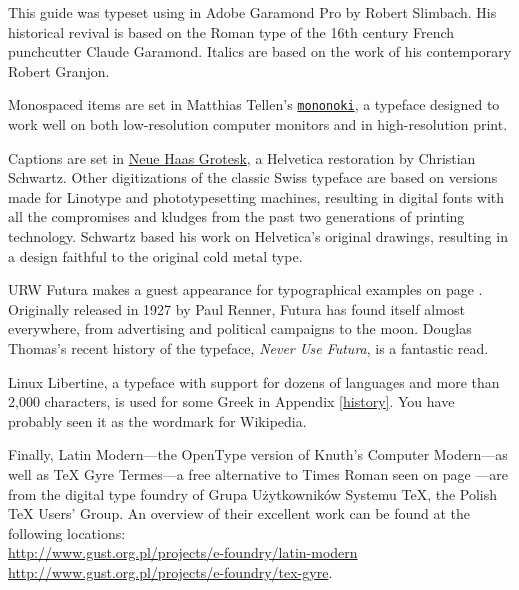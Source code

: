 This guide was typeset using \LuaLaTeX{} in Adobe Garamond Pro by
Robert Slimbach.
His historical revival is based on the Roman type of
the 16{th} century French
punchcutter Claude Garamond.
Italics are based on the work of his contemporary Robert Granjon.

Monospaced items are set in Matthias Tellen's
\href{https://madmalik.github.io/mononoki/}{\texttt{mononoki}},
a typeface designed to work well on both low-resolution computer monitors
and in high-resolution print.

Captions are set in
\href{http://www.fontbureau.com/NHG/}{\textsf{\small Neue Haas Grotesk}},
a Helvetica restoration by Christian Schwartz.
Other digitizations of the classic Swiss typeface are based on versions made for
Linotype and phototypesetting machines,
resulting in digital fonts with all the compromises and kludges from the past two
generations of printing technology.
Schwartz based his work on Helvetica's original drawings,
resulting in a design faithful to the original cold metal type.

{URW Futura}
makes a guest appearance
for typographical examples on page \pageref{typography}.
Originally released in 1927 by Paul Renner,
Futura has found itself almost everywhere,
from advertising and political campaigns to the moon.
Douglas Thomas's recent history of the typeface,
\textit{Never Use Futura}, is a fantastic read.

{Linux Libertine},
a typeface with support for dozens of languages and more than 2,000 characters,
is used for some Greek in Appendix \ref{history}.
You have probably seen it as the wordmark for Wikipedia.

Finally,
Latin Modern---the OpenType version of Knuth's Computer Modern---as well
as {\TeX{} Gyre Termes}---a
free alternative to Times Roman seen on page \pageref{typography}---are from
the digital type foundry of Grupa Użytkowników Systemu \TeX{},
the Polish \TeX{} Users' Group.
An overview of their excellent work can be found at the following locations:\\
\url{http://www.gust.org.pl/projects/e-foundry/latin-modern} \\
\url{http://www.gust.org.pl/projects/e-foundry/tex-gyre}.
